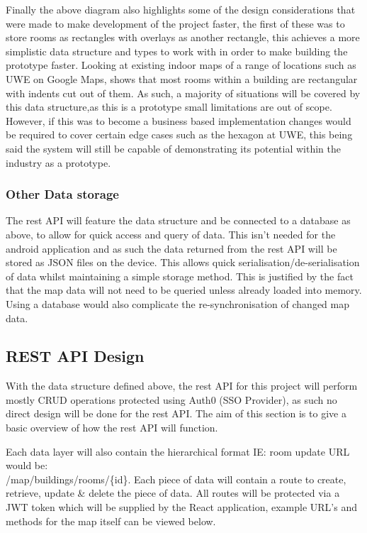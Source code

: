 Finally the above diagram also highlights some of the design considerations that were made to make development of the project faster, the first of these was to store rooms as rectangles with overlays as another rectangle, this achieves a more simplistic data structure and types to work with in order to make building the prototype faster. Looking at existing indoor maps of a range of locations such as UWE on Google Maps, shows that most rooms within a building are rectangular with indents cut out of them. As such, a majority of situations will be covered by this data structure,as this is a prototype small limitations are out of scope. However, if this was to become a business based implementation changes would be required to cover certain edge cases such as the hexagon at UWE, this being said the system will still be capable of demonstrating its potential within the industry as a prototype.

\subsubsection{Other Data storage}
The rest API will feature the data structure and be connected to a database as above, to allow for quick access and query of data. This isn't needed for the android application and as such the data returned from the rest API will be stored as JSON files on the device. This allows quick serialisation/de-serialisation of data whilst maintaining a simple storage method. This is justified by the fact that the map data will not need to be queried unless already loaded into memory. Using a database would also complicate the re-synchronisation of changed map data.

\newpage
\subsection{REST API Design}
With the data structure defined above, the rest API for this project will perform mostly CRUD operations protected using Auth0 (SSO Provider), as such no direct design will be done for the rest API. The aim of this section is to give a basic overview of how the rest API will function.

Each data layer will also contain the hierarchical format IE: room update URL would be:\\ /map/buildings/rooms/\{id\}. Each piece of data will contain a route to create, retrieve, update \& delete the piece of data. All routes will be protected via a JWT token which will be supplied by the React application, example URL's and methods for the map itself can be viewed below.

